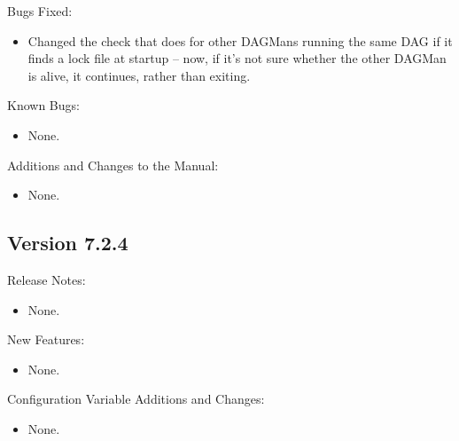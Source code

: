 \noindent Bugs Fixed:

\begin{itemize}

\item Changed the check that  does for other DAGMans
running the same DAG if it finds a lock file at startup -- now, if it's
not sure whether the other DAGMan is alive, it continues, rather than
exiting.

\end{itemize}

\noindent Known Bugs:

\begin{itemize}

\item None.

\end{itemize}

\noindent Additions and Changes to the Manual:

\begin{itemize}

\item None.

\end{itemize}


\subsection*{\label{sec:New-7-2-4}Version 7.2.4}

\noindent Release Notes:

\begin{itemize}

\item None.

\end{itemize}


\noindent New Features:

\begin{itemize}

\item None.

\end{itemize}

\noindent Configuration Variable Additions and Changes:

\begin{itemize}

\item None.

\end{itemize}


